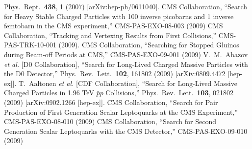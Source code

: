 \documentclass{PoS}
\begin{document}
\begin{thebibliography}{0}
  Phys.\ Rept.\  {\bf 438}, 1 (2007)
  [arXiv:hep-ph/0611040].
 CMS Collaboration,
 ``Search for Heavy Stable Charged Particles with 100 inverse picobarns and 1 inverse femtobarn in the CMS experiment,''
 CMS-PAS-EXO-08-003 (2009)
 CMS Collaboration,
 ``Tracking and Vertexing Results from First Collisions,''
 CMS-PAS-TRK-10-001 (2009).
  CMS Collaboration,
  ``Searching for Stopped Gluinos during Beam-off Periods at CMS,''
  CMS-PAS-EXO-09-001 (2009)
  V.~M.~Abazov {\it et al.}  [D0 Collaboration],
  ``Search for Long-Lived Charged Massive Particles with the D0 Detector,''
  Phys.\ Rev.\ Lett.\  {\bf 102}, 161802 (2009)
  [arXiv:0809.4472 [hep-ex]].
\quad
  T.~Aaltonen {\it et al.}  [CDF Collaboration],
  ``Search for Long-Lived Massive Charged Particles in 1.96 TeV $\bar{p}p$ Collisions,''
  Phys.\ Rev.\ Lett.\  {\bf 103}, 021802 (2009)
  [arXiv:0902.1266 [hep-ex]].
  CMS Collaboration,
  ``Search for Pair Production of First Generation Scalar Leptoquarks at the CMS Experiment,''
  CMS-PAS-EXO-08-010 (2009)
\quad 
  CMS Collaboration,
  ``Search for Second Generation Scalar Leptoquarks with the CMS Detector,''
  CMS-PAS-EXO-09-010 (2009)
\end{thebibliography}
\end{document}
